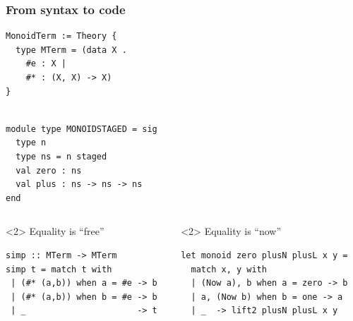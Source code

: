 \documentclass{beamer}
\begin{document}
\begin{frame}[t,fragile]
\frametitle{From syntax to code}
\begin{minipage}{5.4cm}
\lstset{language=mathscheme,basicstyle=\scriptsize}
\begin{lstlisting}
MonoidTerm := Theory {
  type MTerm = (data X . 
    #e : X | 
    #* : (X, X) -> X)
}


\end{lstlisting}
\end{minipage}
\lstset{language=metaocaml,basicstyle=\scriptsize}
\begin{minipage}{5.4cm}
\begin{lstlisting}
module type MONOIDSTAGED = sig
  type n
  type ns = n staged
  val zero : ns
  val plus : ns -> ns -> ns
end
\end{lstlisting}
\end{minipage}
\vspace*{.3cm}\hspace*{-.7cm}
\begin{columns}[T]
\begin{column}{5.5cm}
\begin{visibleenv}<2>
Equality is ``free''\\
\lstset{language=mathscheme,basicstyle=\scriptsize}
\begin{lstlisting}
simp :: MTerm -> MTerm
simp t = match t with
 | (#* (a,b)) when a = #e -> b
 | (#* (a,b)) when b = #e -> b
 | _                      -> t

\end{lstlisting}
\end{visibleenv}
\end{column}
\begin{column}{5.8cm}
\begin{visibleenv}<2>
Equality is ``now''\\
\lstset{language=metaocaml,basicstyle=\scriptsize}
\begin{lstlisting}
let monoid zero plusN plusL x y = 
  match x, y with
  | (Now a), b when a = zero -> b
  | a, (Now b) when b = one -> a
  | _  -> lift2 plusN plusL x y
\end{lstlisting}
\end{visibleenv}
\end{column}
\end{columns}
\end{frame}
\end{document}
